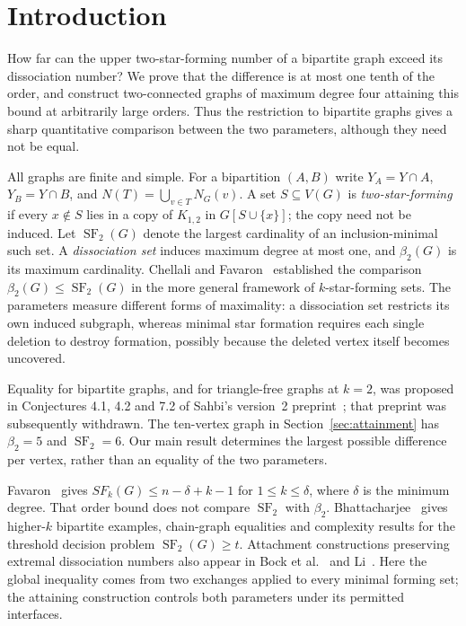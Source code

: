 \documentclass[11pt]{article}
\newcommand{\SF}{\operatorname{SF}_2}
\newcommand{\diss}{\beta_2}
\begin{document}
\section{Introduction}

How far can the upper two-star-forming number of a bipartite graph exceed
its dissociation number? We prove that the difference is at most one tenth
of the order, and construct two-connected graphs of maximum degree four
attaining this bound at arbitrarily large orders. Thus the restriction to
bipartite graphs gives a sharp quantitative comparison between the two
parameters, although they need not be equal.

All graphs are finite and simple. For a bipartition $(A,B)$ write
$Y_A=Y\cap A$, $Y_B=Y\cap B$, and
$N(T)=\bigcup_{v\in T}N_G(v)$. A set $S\subseteq V(G)$ is
\emph{two-star-forming} if every $x\notin S$ lies in a copy of $K_{1,2}$
in $G[S\cup\{x\}]$; the copy need not be induced. Let $\SF(G)$ denote
the largest cardinality of an inclusion-minimal such set. A
\emph{dissociation set} induces maximum degree at most one, and $\diss(G)$
is its maximum cardinality. Chellali and Favaron~\cite{CF09} established
the comparison $\diss(G)\le\SF(G)$ in the more general framework of
$k$-star-forming sets. The parameters measure different forms of maximality:
a dissociation set restricts its own induced subgraph, whereas minimal
star formation requires each single deletion to destroy formation, possibly
because the deleted vertex itself becomes uncovered.

Equality for bipartite graphs, and for triangle-free graphs at $k=2$, was
proposed in Conjectures 4.1, 4.2 and 7.2 of Sahbi's version~2
preprint~\cite{Sahbi}; that preprint was subsequently withdrawn. The
ten-vertex graph in Section~\ref{sec:attainment} has $\diss=5$ and
$\SF=6$. Our main result determines the largest possible difference per
vertex, rather than an equality of the two parameters.

Favaron~\cite[Theorem~10]{Favaron12} gives
$SF_k(G)\le n-\delta+k-1$ for $1\le k\le\delta$, where $\delta$ is the
minimum degree. That order bound does not compare $\SF$ with $\diss$.
Bhattacharjee~\cite{Bhattacharjee} gives higher-$k$ bipartite examples,
chain-graph equalities and complexity results for the threshold decision
problem $\SF(G)\ge t$. Attachment
constructions preserving extremal dissociation numbers also appear in
Bock et al.~\cite{BPPP} and Li~\cite{Li}. Here the global inequality comes
from two exchanges applied to every minimal forming set; the attaining
construction controls both parameters under its permitted interfaces.
\end{document}
